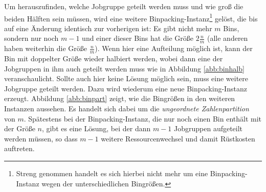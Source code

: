 \documentclass{scrreprt}
\begin{document}
Um herauszufinden, welche Jobgruppe geteilt werden muss und wie groß die beiden Hälften sein müssen,
wird eine weitere Binpacking-Instanz\footnote{Streng genommen handelt es sich hierbei nicht mehr um eine Binpacking-Instanz wegen der unterschiedlichen Bingrößen.} 
gelöst, die bis auf eine Änderung identisch zur vorherigen ist:
Es gibt nicht mehr $m$ Bins, sondern nur noch $m-1$ und einer dieser Bins hat die Größe $2\frac{n}{m}$ (alle anderen haben weiterhin die Größe $\frac{n}{m}$).
Wenn hier eine Aufteilung möglich ist, kann der Bin mit doppelter Größe wieder halbiert werden,
wobei dann eine der Jobgruppen in ihm auch geteilt werden muss wie in Abbildung \ref{abb:binhalb} veranschaulicht.
Sollte auch hier keine Lösung möglich sein, muss eine weitere Jobgruppe geteilt werden.
Dazu wird wiederum eine neue Binpacking-Instanz erzeugt.
Abbildung \ref{abb:binpart} zeigt, wie die Bingrößen in den weiteren Instanzen aussehen.
Es handelt sich dabei um die \textit{ungeordnete Zahlenpartition} von $m$.
Spätestens bei der Binpacking-Instanz, die nur noch einen Bin enthält mit der Größe $n$, gibt es eine Lösung,
bei der dann $m-1$ Jobgruppen aufgeteilt werden müssen, so dass $m-1$ weitere Ressourcenwechsel und damit Rüstkosten auftreten.
\end{document}
